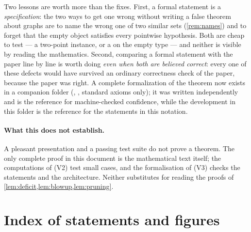 Two lessons are worth more than the fixes. First, a formal statement is a \emph{specification}: the
two ways to get one wrong without writing a false theorem about graphs are to name the wrong one of
two similar sets (\cref{rem:names}) and to forget that the empty object satisfies every pointwise
hypothesis. Both are cheap to test --- a two-point instance, or a  on the empty type ---
and neither is visible by reading the mathematics. Second, comparing a formal statement with the paper
line by line is worth doing \emph{even when both are believed correct}: every one of these defects
would have survived an ordinary correctness check of the paper, because the paper was right.
A complete formalization of the theorem now exists in a companion folder
(, , standard axioms
only); it was written independently and is the reference for machine-checked confidence, while the
development in this folder is the reference for the statements in this notation.

\paragraph{What this does not establish.} A pleasant presentation and a passing test suite do not
prove a theorem. The only complete proof in this document is the mathematical text itself; the
computations of (V2) test small cases, and the formalisation of (V3) checks the statements and the
architecture. Neither substitutes for reading the proofs of \cref{lem:deficit,lem:blowup,lem:pruning}.

\section{Index of statements and figures}\label{app:index}

